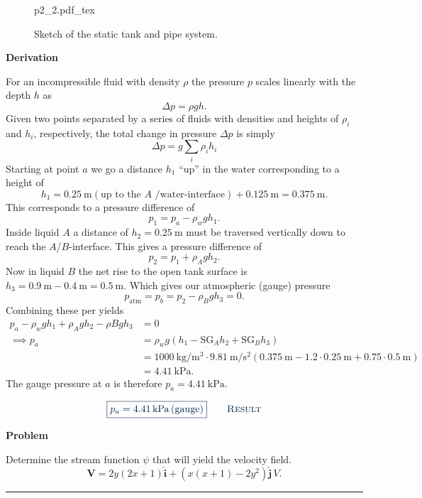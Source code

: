 \documentclass[a4paper]{article}
\renewcommand{\Vec}[1]{\boldsymbol{#1}}
\let\oldhat\hat
\renewcommand{\hat}[1]{\oldhat{\mathbf{#1}}}
\newcommand{\incfig}[2][1]{%
  \def\svgwidth{#1\columnwidth}
  {#2.pdf_tex}
}
\newcounter{problem}
\renewcommand{\theproblem}{\arabic{problem}}
\numberwithin{equation}{problem}
\newenvironment{problem}%
{%
  \refstepcounter{problem}%
  \par\vspace{0pt}%
  {\large\bfseries\sffamily\color{AUblueDark}%
    Problem \theproblem%
  }%
  \par\vspace{.35\baselineskip}%
}%
{%
  \par\vspace{.6\baselineskip}%
  {\color{AUblueDark}\rule{\linewidth}{0.8pt}}%
  \vspace{.6\baselineskip}\par%
}
\newcommand{\AUheading}[1]{%
  \par\vspace{.4\baselineskip}%
  {\sffamily\bfseries\color{AUblueDark}#1\par}%
  \nobreak%
}
\newenvironment{derivation}[1][Derivation]{%
  \AUheading{#1}
  \begingroup\allowdisplaybreaks
  \setlength{\abovedisplayskip}{6pt}%
  \setlength{\belowdisplayskip}{6pt}%
  \setlength{\abovedisplayshortskip}{4pt}%
  \setlength{\belowdisplayshortskip}{4pt}%
}{\par\endgroup\medskip}
\newcommand{\finalresult}[1]{%
  \vspace{.2\baselineskip}%
  \begin{equation}
    {\color{AUblueDark}\boxed{\displaystyle #1}}
    \tag*{\textsc{\textcolor{AUblueDark}{Result}}}
  \end{equation}
  \newpage
}
\begin{document}
\begin{figure}[ht]
    \centering
    \incfig[0.9]{p2_2}
    \caption{Sketch of the static tank and pipe system.}
\end{figure}

\begin{derivation}
For an incompressible fluid with density $\rho$ the pressure $p$ scales linearly with the depth $h$ as
\[ 
\Delta p = \rho g h
.\]
Given two points separated by a series of fluids with densities and heights of $\rho_i$ and $h_i$, respectively, the total change in pressure $\Delta p$ is simply
\begin{equation}\label{eq:delp}
  \Delta p = g \sum_i \rho_i h_i
\end{equation}
Starting at point $a$ we go a distance $h_1$ ``up'' in the water corresponding to a height of
\[ 
h_1 = \qty{0,25}{\meter} (\text{up to the }A \text{ /water-interface}) + \qty{0,125}{\meter} = \qty{0,375}{\meter} 
.\]
This corresponds to a pressure difference of
\[ 
p_1 = p_a - \rho_w g h_1
.\]
Inside liquid $A$ a distance of $h_2 = \qty{0,25}{\meter}$ must be traversed vertically down to reach the $A$/$B$-interface.
This gives a pressure difference of
\[ 
p_2 = p_1 + \rho_{A} g h_2
.\]
Now in liquid $B$ the net rise to the open tank surface is $h_3 = \qty{0,9}{\meter} - \qty{0,4}{\meter} = \qty{0,5}{\meter}$. Which gives our atmospheric (gauge) pressure
\[ 
p_{\mathrm{atm}} = p_b = p_2 - \rho_B g h_3 = 0
.\]
Combining these per  yields
\begin{align*}
  p_a - \rho_w g h_1 + \rho_{A} g h_2 - \rho B g h_3 &= 0 \\
  \implies p_a &= \rho_w g \left( h_1 - \mathrm{SG}_A h_2 + \mathrm{SG}_B h_3 \right) \\
    &= \qty{1000}{\kilogram\per\cubic\meter} \cdot \qty{9,81}{\meter\per\square\second} \left( \qty{0,375}{\meter} - \num{1,2} \cdot \qty{0,25}{\meter} + \num{0,75} \cdot \qty{0,5}{\meter} \right) \\
    &= \qty{4,41}{\kilo\pascal}
.\end{align*}
The gauge pressure at $a$ is therefore $p_a = \qty{4,41}{\kilo\pascal}$.
\end{derivation}

\finalresult{p_a = \qty{4,41}{\kilo\pascal} \, (\text{gauge})}


\begin{problem}
 Determine the stream function $\psi$ that will yield the velocity field.
\[ 
\Vec{V} = 2y \left( 2x + 1 \right) \hat{i} + \left( x \left( x + 1 \right) - 2y^2 \right) \hat{j} \, V
.\] 
\end{problem}
\end{document}
